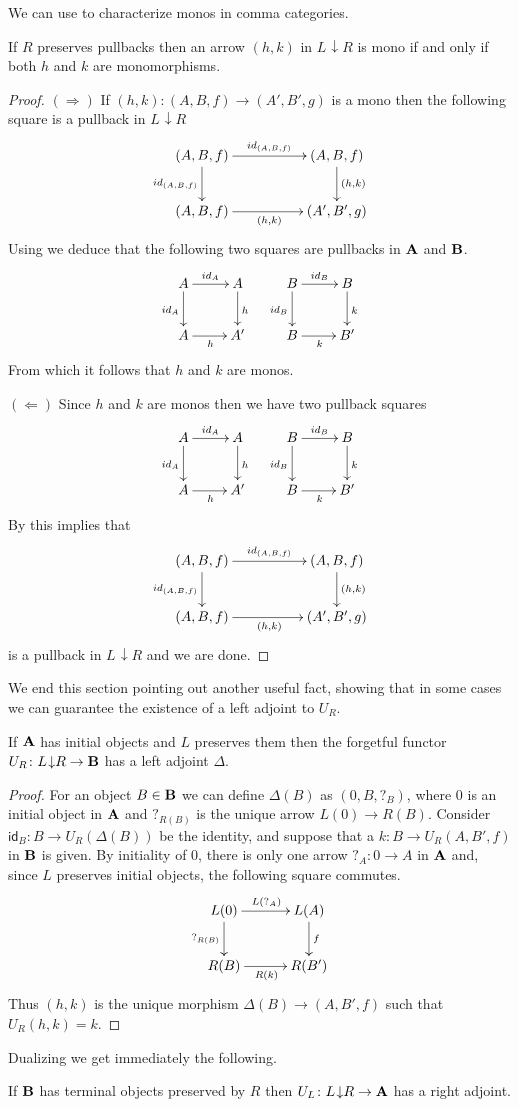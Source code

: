 \documentclass[runningheads,envcountsect]{lipics-v2021}
\def\B{\textbf {\textup{B}}}
\def\A{\textbf {\textup{A}}}
\newcommand{\comma}[2]{#1\hspace{1pt} {\downarrow}#2}
\newcommand{\id}[1]{\mathsf{id}_{#1}}
\begin{document}
We can use  to characterize monos in comma categories. 
\begin{corollary}\label{cor:mono}
	If $R$ preserves pullbacks then an arrow $(h,k)$ in $\comma{L}{R}$ is mono if and only if both $h$ and $k$ are monomorphisms.
\end{corollary}
\begin{proof}
	$(\Rightarrow)$  If $(h,k)\colon (A,B,f)\to (A', B', g)$ is a mono then the following square is a pullback in $\comma{L}{R}$
	\[\xymatrix@C=50pt{(A, B, f)  \ar[r]^{\id{(A,B,f)}} \ar[d]_{\id{(A,B,f)}}& (A, B, f)  \ar[d]^{(h,k)} \\ (A, B, f)  \ar[r]_{(h,k)}& (A', B', g) }\]
	Using  we deduce that the following two squares are pullbacks in $\A$ and $\B$.
	\[\xymatrix{A \ar[r]^{\id{A}} \ar[d]_{\id{A}} & A \ar[d]^{h} & B \ar[r]^{\id{B}} \ar[d]_{\id{B}} & B  \ar[d]^{k}\\ A \ar[r]_{h} & A' & B \ar[r]_{k} & B'}\]
	From which it follows that $h$ and $k$ are monos.
	
	\smallskip\noindent 
	$(\Leftarrow)$ Since $h$ and $k$ are monos then we have two pullback squares 	
	\[\xymatrix{A \ar[r]^{\id{A}} \ar[d]_{\id{A}} & A \ar[d]^{h} & B \ar[r]^{\id{B}} \ar[d]_{\id{B}} & B  \ar[d]^{k}\\ A \ar[r]_{h} & A' & B \ar[r]_{k} & B'}\]
	By  this implies that 
	\[\xymatrix@C=50pt{(A, B, f)  \ar[r]^{\id{(A,B,f)}} \ar[d]_{\id{(A,B,f)}}& (A, B, f)  \ar[d]^{(h,k)} \\ (A, B, f)  \ar[r]_{(h,k)}& (A', B', g) }\]
	is a pullback in $\comma{L}{R}$ and we are done.   
\end{proof}

We end this section pointing out another useful fact,  showing that in some cases we can guarantee  the existence of a left adjoint to $U_R$. 

\begin{proposition}\label{prop:left}
	If $\A$ has initial objects and $L$ preserves them then the forgetful functor $U_R\colon \comma{L}{R}\to \B$ has a left adjoint $\Delta$.
\end{proposition}
\begin{proof} For an object $B\in \B$ we can define $\Delta(B)$ as $(0, B, ?_{B})$, where $0$ is an initial object in $\A$ and $?_{R(B)}$ is the unique arrow $L(0)\to R(B)$. Consider $\id{B}\colon B\to U_R(\Delta(B))$ be the identity, and suppose that a $k\colon B\to U_R(A, B', f)$ in $\B$ is given. By initiality of $0$, there is only one arrow $?_A\colon 0\to A $ in $\A$ and, since $L$ preserves initial objects, the following square commutes.
	\[\xymatrix@C=30pt{L(0) \ar[r]^{L(?_A)} \ar[d]_{?_{R(B)}} & L(A) \ar[d]^{f}\\ R(B) \ar[r]_{R(k)}& R(B')}\]
	Thus $(h,k)$ is the unique morphism $\Delta(B)\to (A, B', f)$	such that $U_R(h,k)=k$.   
\end{proof}
Dualizing we get immediately the following.
\begin{corollary}If $\B$ has terminal objects preserved by $R$ then $U_L\colon \comma{L}{R}\to \A$ has a right adjoint.
\end{corollary}
\end{document}
